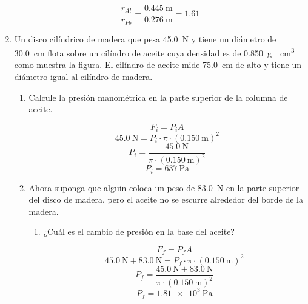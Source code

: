 \documentclass[Análisis.root.tex]{subfiles}
\begin{document}
\begin{enumerate}
        \[\frac{r_{Al}}{r_{Pb}}=\frac{\SI{0,445}{\meter}}{\SI{0,276}{\meter}}=\boxed{\num{1,61}}\]

  \item Un disco cilíndrico de madera que pesa \SI{45,0}{\newton} y tiene un diámetro de \SI{30,0}{\centi\meter} flota sobre un cilíndro de aceite cuya densidad es de \SI{0,850}{\gram\over\centi\meter\cubed} como muestra la figura. El cilíndro de aceite mide \SI{75,0}{\centi\meter} de alto y tiene un diámetro igual al cilíndro de madera.

        \begin{center}
        \end{center}

        \begin{enumerate}
          \item Calcule la presión manométrica en la parte superior de la columna de aceite.

                \[F_i=P_iA\]
                \[\SI{45,0}{\newton}=P_i\cdot\pi\cdot(\SI{0,150}{\meter})^2\]
                \[P_i=\frac{\SI{45,0}{\newton}}{\pi\cdot(\SI{0,150}{\meter})^2}\]
                \[P_i=\boxed{\SI{637}{\pascal}}\]

          \item Ahora suponga que alguin coloca un peso de \SI{83,0}{\newton} en la parte superior del disco de madera, pero el aceite no se escurre alrededor del borde de la madera.

                \begin{enumerate}
                  \item ¿Cuál es el cambio de presión en la base del aceite?

                        \[F_f=P_fA\]
                        \[\SI{45,0}{\newton}+\SI{83,0}{\newton}=P_f\cdot\pi\cdot(\SI{0,150}{\meter})^2\]
                        \[P_f=\frac{\SI{45,0}{\newton}+\SI{83,0}{\newton}}{\pi\cdot(\SI{0,150}{\meter})^2}\]
                        \[P_f=\SI{1,81e3}{\pascal}\]


\end{enumerate}
\end{enumerate}
\end{enumerate}
\end{document}
